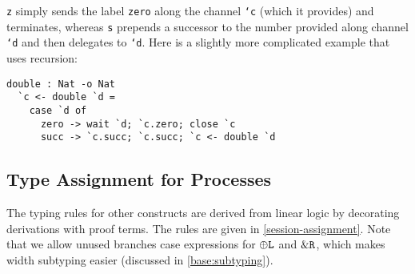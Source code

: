 \texttt{z} simply sends the label \texttt{zero} along the channel \texttt{`c} (which it provides) and terminates, whereas \texttt{s} prepends a successor to the number provided along channel \texttt{`d} and then delegates to \texttt{`d}. Here is a slightly more complicated example that uses recursion:

\begin{lstlisting}[language=krill, style=custom]
  double : Nat -o Nat
  `c <- double `d =
    case `d of
      zero -> wait `d; `c.zero; close `c
      succ -> `c.succ; `c.succ; `c <- double `d
\end{lstlisting}


\subsection{Type Assignment for Processes}

The typing rules for other constructs are derived from linear logic by decorating derivations with proof terms. The rules are given in \cref{session-assignment}. Note that we allow unused branches case expressions for $\oplus\texttt{L}$ and $\&\texttt{R}$, which makes width subtyping easier (discussed in \cref{base:subtyping}).



